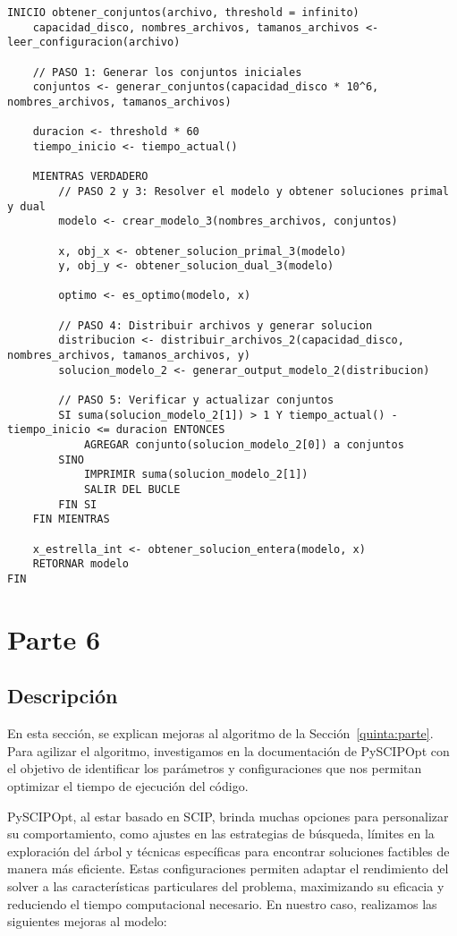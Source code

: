 \documentclass[11pt, a4paper, pdftex]{article}
\begin{document}
\begin{lstlisting}
INICIO obtener_conjuntos(archivo, threshold = infinito)
    capacidad_disco, nombres_archivos, tamanos_archivos <- leer_configuracion(archivo)

    // PASO 1: Generar los conjuntos iniciales
    conjuntos <- generar_conjuntos(capacidad_disco * 10^6, nombres_archivos, tamanos_archivos)

    duracion <- threshold * 60
    tiempo_inicio <- tiempo_actual()

    MIENTRAS VERDADERO
        // PASO 2 y 3: Resolver el modelo y obtener soluciones primal y dual
        modelo <- crear_modelo_3(nombres_archivos, conjuntos)

        x, obj_x <- obtener_solucion_primal_3(modelo)
        y, obj_y <- obtener_solucion_dual_3(modelo)

        optimo <- es_optimo(modelo, x)

        // PASO 4: Distribuir archivos y generar solucion
        distribucion <- distribuir_archivos_2(capacidad_disco, nombres_archivos, tamanos_archivos, y)
        solucion_modelo_2 <- generar_output_modelo_2(distribucion)

        // PASO 5: Verificar y actualizar conjuntos
        SI suma(solucion_modelo_2[1]) > 1 Y tiempo_actual() - tiempo_inicio <= duracion ENTONCES
            AGREGAR conjunto(solucion_modelo_2[0]) a conjuntos
        SINO
            IMPRIMIR suma(solucion_modelo_2[1])
            SALIR DEL BUCLE
        FIN SI
    FIN MIENTRAS

    x_estrella_int <- obtener_solucion_entera(modelo, x)
    RETORNAR modelo
FIN
\end{lstlisting}

\newpage
\section{Parte 6}

\subsection{Descripción}

En esta sección, se explican mejoras al algoritmo de la
Sección~\ref{quinta:parte}. Para agilizar el algoritmo, investigamos en la
documentación de PySCIPOpt con el objetivo de identificar los parámetros y
configuraciones que nos permitan optimizar el tiempo de ejecución del
código.

PySCIPOpt, al estar basado en SCIP, brinda muchas opciones para
personalizar su comportamiento, como ajustes en las estrategias de
búsqueda, límites en la exploración del árbol y técnicas específicas
para encontrar soluciones factibles de manera más eficiente. Estas
configuraciones permiten adaptar el rendimiento del solver a las
características particulares del problema, maximizando su eficacia y
reduciendo el tiempo computacional necesario. En nuestro caso,
realizamos las siguientes mejoras al modelo:
\end{document}
